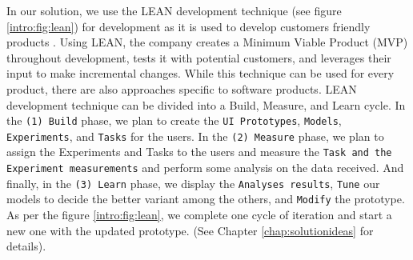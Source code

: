 In our solution, we use the LEAN development technique (see figure \ref{intro:fig:lean}) for development as it is used to develop customers friendly products \cite{article:lean:hart}.
Using LEAN, the company creates a Minimum Viable Product (MVP) throughout development, tests it with potential customers, and leverages their input to make incremental changes.
While this technique can be used for every product, there are also approaches specific to software products.
LEAN development technique can be divided into a Build, Measure, and Learn cycle. 
In the \texttt{(1) Build} phase, we plan to create the \texttt{UI Prototypes}, \texttt{Models}, \texttt{Experiments}, and \texttt{Tasks} for the users.
In the \texttt{(2) Measure} phase, we plan to assign the Experiments and Tasks to the users and measure the \texttt{Task and the Experiment measurements} and perform some analysis on the data received. 
And finally, in the \texttt{(3) Learn} phase, we display the \texttt{Analyses results}, \texttt{Tune} our models to decide the better variant among the others, and \texttt{Modify} the prototype.
As per the figure \ref{intro:fig:lean}, we complete one cycle of iteration and start a new one with the updated prototype.
(See Chapter \ref{chap:solutionideas} for details).
